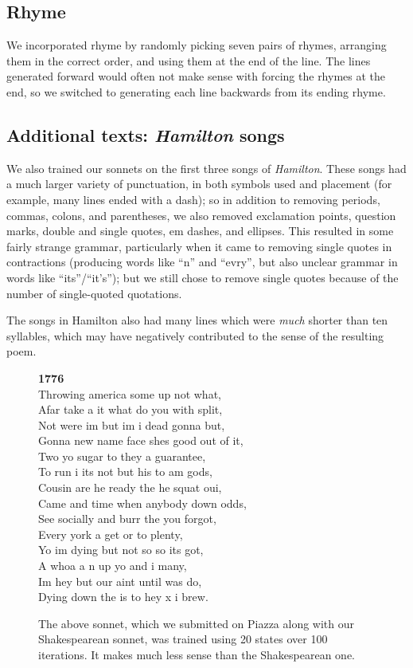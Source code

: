 \subsection{Rhyme}
We incorporated rhyme by randomly picking seven pairs of rhymes, arranging them in the correct order, and using them at the end of the line. The lines generated forward would often not make sense with forcing the rhymes at the end, so we switched to generating each line backwards from its ending rhyme.

\subsection{Additional texts: \emph{Hamilton} songs}
We also trained our sonnets on the first three songs of \emph{Hamilton}.  These songs had a much larger variety of punctuation, in both symbols used and placement (for example, many lines ended with a dash); so in addition to removing periods, commas, colons, and parentheses, we also removed exclamation points, question marks, double and single quotes, em dashes, and ellipses.  This resulted in some fairly strange grammar, particularly when it came to removing single quotes in contractions (producing words like ``n'' and ``evry'', but also unclear grammar in words like ``its''/``it's''); but we still chose to remove single quotes because of the number of single-quoted quotations.  

The songs in Hamilton also had many lines which were \emph{much} shorter than ten syllables, which may have negatively contributed to the sense of the resulting poem.

\begin{figure}[h!]
	\begin{center}
{\bf 1776}\\
Throwing america some up not what, \\
Afar take a it what do you with split, \\
Not were im but im i dead gonna but,  \\
Gonna new name face shes good out of it, \\
Two yo sugar to they a guarantee,  \\
To run i its not but his to am gods,  \\
Cousin are he ready the he squat oui,  \\
Came and time when anybody down odds, \\
See socially and burr the you forgot,  \\
Every york a get or to plenty,  \\
Yo im dying but not so so its got,  \\
A whoa a n up yo and i many, \\
Im hey but our aint until was do,  \\
Dying down the is to hey x i brew. 
	\end{center}
	\caption{
		The above sonnet, which we submitted on Piazza along with our Shakespearean sonnet, was trained using 20 states over 100 iterations.  It makes much less sense than the Shakespearean one.
	}
\end{figure}

